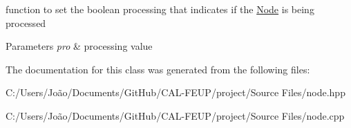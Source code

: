 function to set the boolean processing that indicates if the \hyperlink{class_node}{Node} is being processed 


\begin{DoxyParams}{Parameters}
{\em pro} & processing value \\
\hline
\end{DoxyParams}


The documentation for this class was generated from the following files\+:\begin{DoxyCompactItemize}
\item 
C\+:/\+Users/\+João/\+Documents/\+Git\+Hub/\+C\+A\+L-\/\+F\+E\+U\+P/project/\+Source Files/node.\+hpp\item 
C\+:/\+Users/\+João/\+Documents/\+Git\+Hub/\+C\+A\+L-\/\+F\+E\+U\+P/project/\+Source Files/node.\+cpp\end{DoxyCompactItemize}

